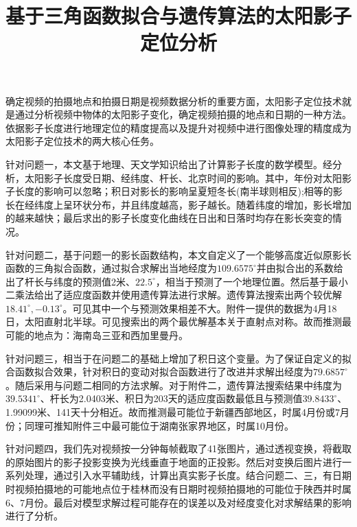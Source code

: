 \documentclass[12pt]{cumcmart}   %
\begin{document}
\renewcommand{\baselinestretch}{1.3}\normalsize  %

\title{基于三角函数拟合与遗传算法的太阳影子定位分析}


\maketitle
\begin{cnabstract}%
确定视频的拍摄地点和拍摄日期是视频数据分析的重要方面，太阳影子定位技术就是通过分析视频中物体的太阳影子变化，确定视频拍摄的地点和日期的一种方法。依据影子长度进行地理定位的精度提高以及提升对视频中进行图像处理的精度成为太阳影子定位技术的两大核心任务。

针对问题一，本文基于地理、天文学知识给出了计算影子长度的数学模型。经分析，太阳影子长度受日期、经纬度、杆长、北京时间的影响。其中，年份对太阳影子长度的影响可以忽略；积日对影长的影响呈夏短冬长(南半球则相反);相等的影长在经纬度上呈环状分布，并且纬度越高，影子越长。随着纬度的增加，影长增加的越来越快；最后求出的影子长度变化曲线在日出和日落时均存在影长突变的情况。

针对问题二，基于问题一的影长函数结构，本文自定义了一个能够高度近似原影长函数的三角拟合函数，通过拟合求解出当地经度为$109.6575^\circ$并由拟合出的系数给出了杆长与纬度的预测值2米、$22.5^\circ$，相当于预测了一个地理位置。然后基于最小二乘法给出了适应度函数并使用遗传算法进行求解。遗传算法搜索出两个较优解$18.41^\circ,-0.13^\circ$。可见其中一个与预测效果相差不大。附件一提供的数据为4月18日，太阳直射北半球。可见搜索出的两个最优解基本关于直射点对称。故而推测最可能的地点为：海南岛三亚和西加里曼丹。


针对问题三，相当于在问题二的基础上增加了积日这个变量。为了保证自定义的拟合函数拟合效果，针对积日的变动对拟合函数进行了改进并求解出经度为$79.6857^\circ$。随后采用与问题二相同的方法求解。对于附件二，遗传算法搜索结果中纬度为$39.5341^\circ$、杆长为2.0403米、积日为203天的适应度函数最低且与预测值$39.8433^\circ$、1.99099米、141天十分相近。故而推测最可能位于新疆西部地区，时属4月份或7月份；同理可推知附件三中最可能位于湖南张家界地区，时属10月份。

针对问题四，我们先对视频按一分钟每帧截取了41张图片，通过透视变换，将截取的原始图片的影子投影变换为光线垂直于地面的正投影。然后对变换后图片进行一系列处理，通过引入水平辅助线，计算出真实影子长度。结合问题二、三，有日期时视频拍摄地的可能地点位于桂林而没有日期时视频拍摄地的可能位于陕西并时属6、7月份。最后对模型求解过程可能存在的误差以及对经度变化对求解结果的影响进行了分析。



\end{cnabstract}
\end{document}

